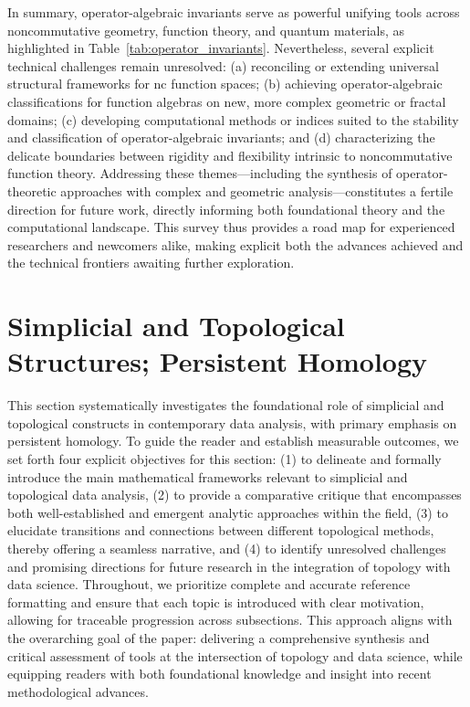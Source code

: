 \documentclass[sigconf]{acmart}
\begin{document}
In summary, operator-algebraic invariants serve as powerful unifying tools across noncommutative geometry, function theory, and quantum materials, as highlighted in Table~\ref{tab:operator_invariants}. Nevertheless, several explicit technical challenges remain unresolved: (a) reconciling or extending universal structural frameworks for nc function spaces; (b) achieving operator-algebraic classifications for function algebras on new, more complex geometric or fractal domains; (c) developing computational methods or indices suited to the stability and classification of operator-algebraic invariants; and (d) characterizing the delicate boundaries between rigidity and flexibility intrinsic to noncommutative function theory. Addressing these themes---including the synthesis of operator-theoretic approaches with complex and geometric analysis---constitutes a fertile direction for future work, directly informing both foundational theory and the computational landscape. This survey thus provides a road map for experienced researchers and newcomers alike, making explicit both the advances achieved and the technical frontiers awaiting further exploration.

\section{Simplicial and Topological Structures; Persistent Homology}

This section systematically investigates the foundational role of simplicial and topological constructs in contemporary data analysis, with primary emphasis on persistent homology. To guide the reader and establish measurable outcomes, we set forth four explicit objectives for this section: (1) to delineate and formally introduce the main mathematical frameworks relevant to simplicial and topological data analysis, (2) to provide a comparative critique that encompasses both well-established and emergent analytic approaches within the field, (3) to elucidate transitions and connections between different topological methods, thereby offering a seamless narrative, and (4) to identify unresolved challenges and promising directions for future research in the integration of topology with data science. Throughout, we prioritize complete and accurate reference formatting and ensure that each topic is introduced with clear motivation, allowing for traceable progression across subsections. This approach aligns with the overarching goal of the paper: delivering a comprehensive synthesis and critical assessment of tools at the intersection of topology and data science, while equipping readers with both foundational knowledge and insight into recent methodological advances.
\end{document}
